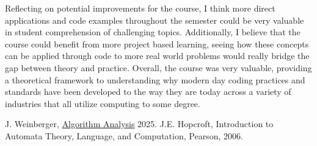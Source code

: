 \documentclass{article}
\theoremstyle{theorem}
\theoremstyle{definition}
\theoremstyle{remark}
\begin{document}
Reflecting on potential improvements for the course, I think more direct applications and code examples throughout the semester could be very valuable in student comprehension of challenging topics. Additionally, I believe that the course could benefit from more project based learning, seeing how these concepts can be applied through code to more real world problems would really bridge the gap between theory and practice. Overall, the course was very valuable, providing a theoretical framework to understanding why modern day coding practices and standards have been developed to the way they are today across a variety of industries that all utilize computing to some degree.


\begin{thebibliography}{99}
 J. Weinberger, \href{https://github.com/jonweinb/algorithm-analysis-2025}{Algorithm Analysis} 2025.
 J.E. Hopcroft, {Introduction to Automata Theory, Language, and Computation}, Pearson, 2006.
\end{thebibliography}
\end{document}
